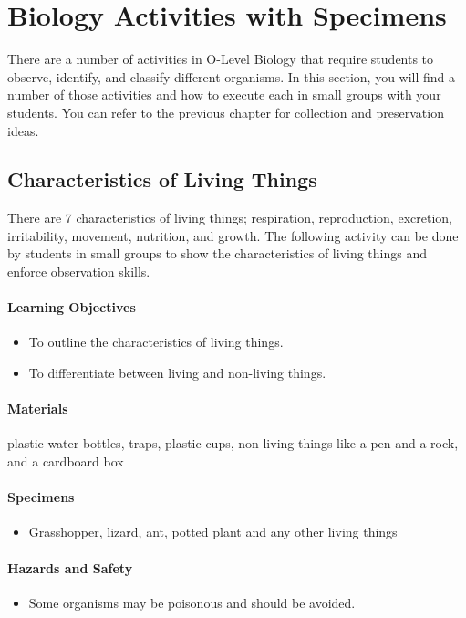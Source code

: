 \chapter{Biology Activities with Specimens}
There are a number of activities in O-Level Biology that require students to observe, identify, and classify different organisms. In this section, you will find a number of those activities and how to execute each in small groups with your students. You can refer to the previous chapter for collection and preservation ideas.

\section{Characteristics of Living Things}
There are 7 characteristics of living things; respiration, reproduction, excretion, irritability, movement, nutrition, and growth. The following activity can be done by students in small groups to show the characteristics of living things and enforce observation skills.

\subsubsection*{Learning Objectives}
\begin{itemize}
\item{To outline the characteristics of living things.}
\item{To differentiate between living and non-living things.}
\end{itemize}

\subsubsection*{Materials}
plastic water bottles, traps, plastic cups, non-living things like a pen and a rock, and a cardboard box

\subsubsection*{Specimens}
\begin{itemize}
\item{Grasshopper, lizard, ant, potted plant and any other living things}
\end{itemize}

\subsubsection*{Hazards and Safety}
\begin{itemize}
\item{Some organisms may be poisonous and should be avoided.}
\end{itemize}

